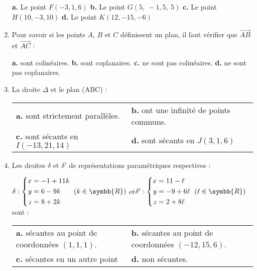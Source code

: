 \documentclass[french,no-indent,FontSize=11pt]{tango}
\begin{document}
\begin{enumerate}
		\textbf{a.} Le point $F(-3,1,6)$  
		\hfill \textbf{b.}  Le point $G (5,\:-1{,}5,\:5)$
		\hfill \textbf{c.}  Le point $H (10,-3,10)$ 
		\hfill \textbf{d.} Le point $K (12,-15,-6)$ 

\bigskip

		\item Pour savoir si les points $A$, $B$ et $C$ définissent un plan, il faut vérifier que $\overrightarrow{AB}$ et $\overrightarrow{AC}$ : 
		
\medskip
	
			\textbf{a.} sont colinéaires. 
			\hfill \textbf{b.} sont coplanaires. 
			\hfill \textbf{c.} ne sont pas colinéaires.  
			\hfill \textbf{d.} ne sont pas coplanaires.
			
\bigskip
	
		\item La droite $\Delta$ et le plan (ABC) :

\medskip	
		
		\begin{tabular}{ll}
			\textbf{a.} sont strictement parallèles.  
			&\textbf{b.} ont une infinité de points communs.\\[12pt]
			\textbf{c.} sont sécants en   $I(-13,21,14)$   
			&\textbf{d.} sont sécants en  $J(3,1,6)$ 
		\end{tabular}
		
		\bigskip
			
\item Les droites $\delta$ et $\delta'$ de représentations paramétriques respectives : 
			
			$ \delta : \left\{
		\begin{aligned}
		x&= -1 + 11k\\
		y&= 6 - 9k\\
		z&= 8 +2k\\
		\end{aligned} \right.~(k \in \symbb{R})$
		 \quad et\quad  $\delta' : \left\{
		\begin{aligned}
		x&= 11 -\ell\\
		y&= - 9+6\ell\\
		z&= 2 +8\ell\\
		\end{aligned} \right.~(\ell \in \symbb{R})$\quad sont : 
		
		\medskip
		
	\begin{tabular}{ll}	
	\textbf{a.} sécantes au point de coordonnées $(1,1,1)$. 
	& \textbf{b.} sécantes au point de coordonnées $(-12,15,6)$.\\[12pt] 
	\textbf{c.} sécantes en un autre point
	&\textbf{d.} non sécantes.  
	\end{tabular}
		
			
\end{enumerate}
\end{document}
